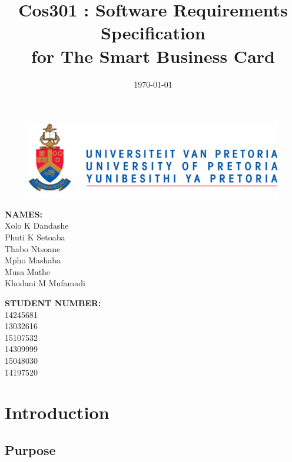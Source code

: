 \documentclass[english]{article}
\title{Cos301 : Software Requirements Specification\\
	for The Smart Business Card\\
	}
\date{\today}
\begin{document}
	\maketitle
	\begin{figure}[!t]
		\includegraphics{up_logo.png}
	\end{figure}
	\begin{minipage}{0.4\textwidth}
		\begin{flushleft} \large
			\textbf{NAMES:}\\[0.4cm]
			Xolo K Dandashe\\
			Phuti K Setoaba\\
			Thabo Ntsoane\\
			Mpho Mashaba\\	
			Musa Mathe\\
			Khodani M Mufamadi
		\end{flushleft}
	\end{minipage}
	\begin{minipage}{0.4\textwidth}
		\begin{flushright} \large
			\textbf{STUDENT NUMBER:} \\[0.4cm]
		 	14245681\\ 	
		 	13032616\\		
		 	15107532\\	
		 	14309999\\		
		 	15048030\\	
		 	14197520
		\end{flushright}
	\end{minipage}


	
	\newpage

	\tableofcontents
	\newpage

	

	\section{Introduction}
			

		\subsection{Purpose}
			
\end{document}
